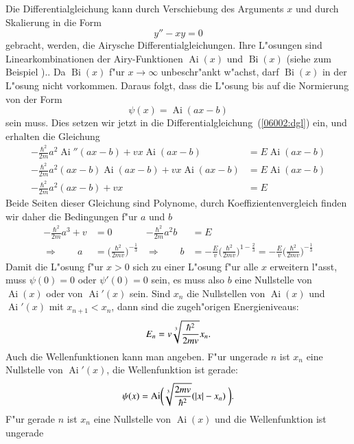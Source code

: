 \begin{loesung}
Die Differentialgleichung kann durch Verschiebung des Arguments $x$ 
und durch Skalierung in die Form
\[
y''-xy=0
\]
gebracht, werden, die Airysche Differentialgleichungen. 
Ihre L"osungen sind Linearkombinationen der Airy-Funktionen
$\operatorname{Ai}(x)$ und $\operatorname{Bi}(x)$ (siehe zum Beispiel
\cite{skript:airy})..
Da $\operatorname{Bi}(x)$ f"ur $x\to\infty$ unbeschr"ankt
w"achst, darf $\operatorname{Bi}(x)$ in der L"osung nicht
vorkommen.
Daraus folgt, dass die L"osung bis auf die Normierung von der
Form
\[
\psi(x)=\operatorname{Ai}(ax-b)
\]
sein muss.
Dies setzen wir jetzt in die Differentialgleichung~(\ref{06002:dgl}) ein,
und erhalten die Gleichung
\begin{align*}
-\frac{\hbar^2}{2m}a^2\operatorname{Ai}''(ax-b)
+
vx\operatorname{Ai}(ax-b)
&=
E\operatorname{Ai}(ax-b)
\\
-\frac{\hbar^2}{2m}a^2(ax-b)\operatorname{Ai}(ax-b)
+
vx\operatorname{Ai}(ax-b)
&=
E\operatorname{Ai}(ax-b)
\\
-\frac{\hbar^2}{2m}a^2(ax-b)
+
vx
&=
E
\end{align*}
Beide Seiten dieser Gleichung sind Polynome, durch Koeffizientenvergleich
finden wir daher die Bedingungen f"ur $a$ und $b$
\begin{align*}
-\frac{\hbar^2}{2m}a^3+v&=0
&
-\frac{\hbar^2}{2m}a^2b&=E
\\
\Rightarrow\qquad
a &= \biggl(\frac{\hbar^2}{2mv}\biggr)^{-\frac13}
&
\Rightarrow\qquad
b &= -\frac{E}{v}\biggl(\frac{\hbar^2}{2mv}\biggr)^{1-\frac23}
= -\frac{E}{v}\biggl(\frac{\hbar^2}{2mv}\biggr)^{-\frac13}
\end{align*}
Damit die L"osung f"ur $x>0$ sich zu einer L"osung f"ur alle $x$
erweitern l"asst, muss $\psi(0)=0$ oder $\psi'(0)=0$ sein,
es muss also $b$ eine Nullstelle von $\operatorname{Ai}(x)$ oder
von $\operatorname{Ai}'(x)$ sein.
Sind $x_n$ die Nullstellen von $\operatorname{Ai}(x)$ und
$\operatorname{Ai}'(x)$ mit $x_{n+1}<x_n$, dann sind die zugeh"origen
Energieniveaus:
\[
E_n=v\root 3\of{\frac{\hbar^2}{2mv}} x_n.
\]
Auch die Wellenfunktionen kann man angeben.
F"ur ungerade $n$ ist $x_n$ eine Nullstelle von $\operatorname{Ai}'(x)$,
die Wellenfunktion ist gerade:
\begin{equation}
\psi(x)
=
\operatorname{Ai}\biggl( \root3\of{\frac{2mv}{\hbar^2}}(|x|-x_n) \biggr).
\end{equation}
F"ur gerade $n$ ist $x_n$ eine Nullstelle von $\operatorname{Ai}(x)$
und die Wellenfunktion ist ungerade
\begin{equation}

\end{equation}
\end{loesung}
